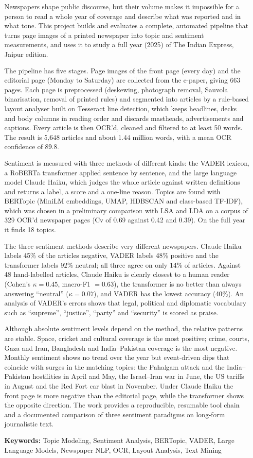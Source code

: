 Newspapers shape public discourse, but their volume makes it impossible for a person to read a whole year of coverage and describe what was reported and in what tone. This project builds and evaluates a complete, automated pipeline that turns page images of a printed newspaper into topic and sentiment measurements, and uses it to study a full year (2025) of The Indian Express, Jaipur edition.

The pipeline has five stages. Page images of the front page (every day) and the editorial page (Monday to Saturday) are collected from the e-paper, giving 663 pages. Each page is preprocessed (deskewing, photograph removal, Sauvola binarisation, removal of printed rules) and segmented into articles by a rule-based layout analyser built on Tesseract line detection, which keeps headlines, decks and body columns in reading order and discards mastheads, advertisements and captions. Every article is then OCR'd, cleaned and filtered to at least 50 words. The result is 5,648 articles and about 1.44 million words, with a mean OCR confidence of 89.8.

Sentiment is measured with three methods of different kinds: the VADER lexicon, a RoBERTa transformer applied sentence by sentence, and the large language model Claude Haiku, which judges the whole article against written definitions and returns a label, a score and a one-line reason. Topics are found with BERTopic (MiniLM embeddings, UMAP, HDBSCAN and class-based TF-IDF), which was chosen in a preliminary comparison with LSA and LDA on a corpus of 329 OCR'd newspaper pages (Cv of 0.69 against 0.42 and 0.39). On the full year it finds 18 topics.

The three sentiment methods describe very different newspapers. Claude Haiku labels 45\% of the articles negative, VADER labels 48\% positive and the transformer labels 92\% neutral; all three agree on only 14\% of articles. Against 48 hand-labelled articles, Claude Haiku is clearly closest to a human reader (Cohen's $\kappa = 0.45$, macro-F1 $= 0.63$), the transformer is no better than always answering ``neutral'' ($\kappa = 0.07$), and VADER has the lowest accuracy (40\%). An analysis of VADER's errors shows that legal, political and diplomatic vocabulary such as ``supreme'', ``justice'', ``party'' and ``security'' is scored as praise.

Although absolute sentiment levels depend on the method, the relative patterns are stable. Space, cricket and cultural coverage is the most positive; crime, courts, Gaza and Iran, Bangladesh and India--Pakistan coverage is the most negative. Monthly sentiment shows no trend over the year but event-driven dips that coincide with surges in the matching topics: the Pahalgam attack and the India--Pakistan hostilities in April and May, the Israel--Iran war in June, the US tariffs in August and the Red Fort car blast in November. Under Claude Haiku the front page is more negative than the editorial page, while the transformer shows the opposite direction. The work provides a reproducible, resumable tool chain and a documented comparison of three sentiment paradigms on long-form journalistic text.

\vspace{2mm}
\noindent\textbf{Keywords:} Topic Modeling, Sentiment Analysis, BERTopic, VADER, Large Language Models, Newspaper NLP, OCR, Layout Analysis, Text Mining

